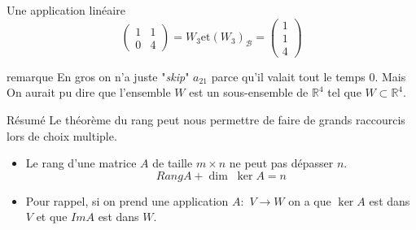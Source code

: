 \begin{parag}{Une application linéaire}
\[\begin{pmatrix}
         1 & 1 \\ 0 & 4
     \end{pmatrix} = W_3 \text{et} \left(W_3\right)_{\mathcal{B}} = \begin{pmatrix}
         1 \\ 1 \\ 4
     \end{pmatrix}\]
     \begin{subparag}{remarque}
         En gros on n'a juste "\textit{skip}" $a_{21}$ parce qu'il valait tout le temps $0$. Mais On aurait pu dire que l'ensemble $W$ est un sous-ensemble de $\mathbb{R}^4$ tel que $W \subset \mathbb{R}^4$.
     \end{subparag}
 \end{parag}

 \begin{parag}{Résumé}
     Le théorème du rang peut nous permettre de faire de grands raccourcis lors de choix multiple.
     \begin{itemize}
         \item Le rang d'une matrice $A$ de taille $m \times n$ ne peut pas dépasser $n$.
         \[Rang  A + \dim\; \ker A = n\]
         \item Pour rappel, si on prend une application $A :$ $V \to W$ on a que $\ker A$ est dans $V$ et que $Im A$ est dans $W$.                               
     \end{itemize}
 \end{parag}